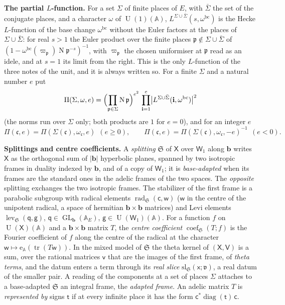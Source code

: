 \documentclass[11pt,a4paper]{article}
\newcommand{\kw}[1]{\emph{#1}}
\newcommand{\subhead}[1]{\par\addvspace{9pt plus 2pt}\Needspace{4\baselineskip}\noindent\textbf{#1}\enspace\ignorespaces}
\theoremstyle{plainx}
\theoremstyle{uprightx}
\newcommand{\bb}{\mathbf{b}}
\newcommand{\sW}{\mathsf{W}}
\newcommand{\sV}{\mathsf{V}}
\newcommand{\sX}{\mathsf{X}}
\newcommand{\sg}{\mathsf{g}}
\newcommand{\sx}{\mathsf{x}}
\newcommand{\sq}{\mathsf{q}}
\newcommand{\fc}{\mathfrak{c}}
\newcommand{\fp}{\mathfrak{p}}
\newcommand{\fv}{\mathfrak{v}}
\newcommand{\fS}{\mathfrak{S}}
\newcommand{\A}{\mathbb{A}}
\newcommand{\GL}{\operatorname{GL}}
\newcommand{\U}{\operatorname{U}}
\newcommand{\tr}{\operatorname{tr}}
\newcommand{\LP}[2]{\Pi(#1,#2)}
\newcommand{\cf}[3]{\operatorname{coef}_{#1}(#2;#3)}
\newcommand{\Np}{\operatorname{N}}
\begin{document}
\subhead{The partial $L$-function.} For a set $\Sigma$ of finite places of $E$, with $\bar\Sigma$ the set of the
conjugate places, and a character $\omega$ of $\U(1)(\A)$, $L^{\Sigma\cup\bar\Sigma}(s,\omega^{\mathrm{bc}})$ is the
Hecke $L$-function of the base change $\omega^{\mathrm{bc}}$ without the Euler factors at the places of
$\Sigma\cup\bar\Sigma$: for real $s>1$ the Euler product over the finite places
$\fp\notin\Sigma\cup\bar\Sigma$ of $(1-\omega^{\mathrm{bc}}(\varpi_{\fp})\Np\fp^{-s})^{-1}$, with $\varpi_{\fp}$ the
chosen uniformiser at $\fp$ read as an idele, and at $s=1$ its limit from the right. This is the only $L$-function of the three notes of the unit, and it is always written so. For a
finite $\Sigma$ and a natural number $e$ put
\[\Pi(\Sigma,\omega,e)=\Bigl(\prod_{\fp\in\Sigma}\Np\fp\Bigr)^{e^2}\,\prod_{\mathbf{i}=1}^{e}\bigl|L^{\Sigma\cup\bar\Sigma}(\mathbf{i},\omega^{\mathrm{bc}})\bigr|^{2}\]
(the norms run over $\Sigma$ only; both products are $1$ for $e=0$), and for an integer $e$
\[\LP{\fc}{e}=\Pi(\Sigma(\fc),\omega_{\fc},e)\ \ (e\ge0),\qquad
\LP{\fc}{e}=\Pi(\Sigma(\fc),\omega_{\fc},-e)^{-1}\ \ (e<0).\]

\subhead{Splittings and centre coefficients.} A \kw{splitting} $\fS$ of $\sX$ over $\sW_1$ along $\bb$ writes
$\sX$ as the orthogonal sum of $|\bb|$ hyperbolic planes, spanned by two isotropic frames in duality indexed by
$\bb$, and of a copy of $\sW_1$; it is \kw{base-adapted} when its frames are the standard ones in the adelic
frames of the two spaces. The \kw{opposite} splitting exchanges the two isotropic frames. The stabilizer of the
first frame is a parabolic subgroup with radical elements $\operatorname{rad}_{\fS}(\mathsf{c},\mathsf{w})$ ($\mathsf{w}$ in the centre of the unipotent
radical, a space of hermitian $\bb\times\bb$ matrices) and Levi elements $\operatorname{lev}_{\fS}(\sq,\sg)$,
$\sq\in\GL_{\bb}(\A_E)$, $\sg\in\U(\sW_1)(\A)$. For a function $f$ on $\U(\sX)(\A)$ and a $\bb\times\bb$ matrix
$T$, the \kw{centre coefficient} $\cf{\fS}{T}{f}$ is the Fourier coefficient of $f$ along the centre of the
radical at the character $\mathsf{w}\mapsto\mathrm{e}_{\A}(\tr(T\mathsf{w}))$. In the mixed model of $\fS$ the theta kernel of
$(\sX,\sV)$ is a sum, over the rational matrices $\mathsf{v}$ that are the images of the first frame, of \kw{theta terms},
and the datum enters a term through its \kw{real slice} $\mathrm{sl}_{\fS}(\sx;\fv)$, a real datum of the smaller
pair. A reading of the components at a set of places $\Sigma$ attaches to a base-adapted $\fS$ an integral frame,
the \kw{adapted frame}. An adelic matrix $T$ is \kw{represented by} signs $\mathsf{t}$ if at every infinite place it has the
form $\mathsf{c}^{*}\operatorname{diag}(\mathsf{t})\,\mathsf{c}$.
\end{document}

